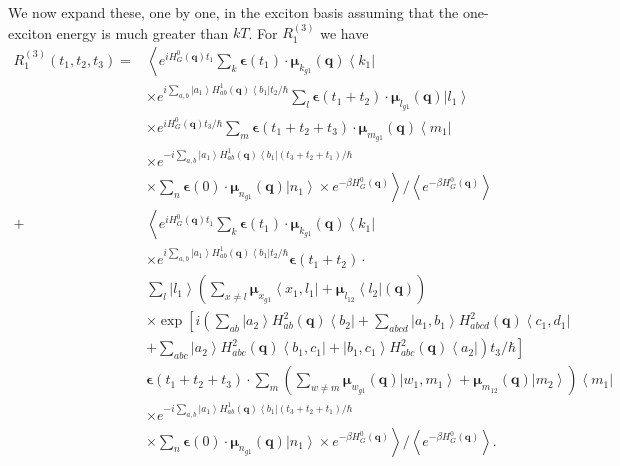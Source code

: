 \documentclass{article}
\newcommand{\bra}[1]{\ensuremath{\left\langle#1\right|}}
\newcommand{\ket}[1]{\ensuremath{\left|#1\right\rangle}}
\newcommand{\ensb}[1]{\left\langle#1\right\rangle}
\newcommand{\vect}[1]{\ensuremath{\boldsymbol{\mathbf{#1}}}}
\begin{document}
We now expand these, one by one, in the exciton basis assuming that the one-exciton energy is much greater than $kT$.
For $R_{1}^{(3)}$ we have
\begin{equation}
\begin{split}
R_{1}^{(3)}(t_{1},t_{2},t_{3})=
&\left \langle e^{iH_{G}^{0}(\vect q)t_{1}}\sum_{k}\vect{\epsilon}(t_{1})\cdot\vect\mu_{k_{g1}}(\vect q)\bra{k_{1}}\right.\\
&\times e^{i\sum_{a,b}\ket{a_{1}}H_{ab}^{1}(\vect q)\bra{b_{1}}t_{2}/\hbar}\sum_{l}\vect\epsilon(t_{1}+t_{2})\cdot\vect\mu_{l_{g1}}(\vect q)\ket{l_{1}}\\
&\times e^{iH_{G}^{0}(\vect q)t_{3}/\hbar}\sum_{m}\vect\epsilon(t_{1}+t_{2}+t_{3})\cdot\vect\mu_{m_{g1}}(\vect q)\bra{m_{1}}\\
&\times e^{-i\sum_{a,b}\ket{a_{1}}H_{ab}^{1}(\vect q)\bra{b_{1}}(t_{3}+t_{2}+t_{1})/\hbar}\\
&\left. \times \sum_{n}\vect\epsilon(0)\cdot\vect\mu_{n_{g1}}(\vect q)\ket{n_{1}}
\times e^{-\beta H_{G}^{0}(\vect{q})}\right\rangle/\ensb{e^{-\beta H_{G}^{0}(\vect{q})}}\\
+&\left \langle e^{iH_{G}^{0}(\vect q)t_{1}}\sum_{k}\vect{\epsilon}(t_{1})\cdot\vect\mu_{k_{g1}}(\vect q)\bra{k_{1}}\right.\\
&\times e^{i\sum_{a,b}\ket{a_{1}}H_{ab}^{1}(\vect q)\bra{b_{1}}t_{2}/\hbar}\vect\epsilon(t_{1}+t_{2})\cdot\\
&\sum_{l}\ket{l_{1}}\left(\sum_{x\ne l}\vect\mu_{x_{g1}}\bra{x_{1},l_{1}}+\vect\mu_{l_{12}}\bra{l_{2}}(\vect q)\right)\\
&\times \exp\left[i\left(\sum_{ab}\ket{a_{2}}H_{ab}^{2}(\vect{q})\bra{b_{2}}+\sum_{abcd}\ket{a_{1},b_{1}}H_{abcd}^{2}(\vect{q})\bra{c_{1},d_{1}}\right.\right.\\
&\left.\left.+\sum_{abc}\ket{a_{2}}H_{abc}^{2}(\vect{q})\bra{b_{1},c_{1}}+\ket{b_{1},c_{1}}H_{abc}^{2}(\vect{q})\bra{a_{2}}\right)t_{3}/\hbar\right]\\
&\vect\epsilon(t_{1}+t_{2}+t_{3})\cdot\sum_{m}\left( 
\sum_{w\ne m}\vect\mu_{w_{g1}}(\vect q)\ket{w_{1},m_{1}}
+\vect\mu_{m_{12}}(\vect q)\ket{m_{2}}\right)\bra{m_{1}}\\
&\times e^{-i\sum_{a,b}\ket{a_{1}}H_{ab}^{1}(\vect q)\bra{b_{1}}(t_{3}+t_{2}+t_{1})/\hbar}\\
&\left. \times \sum_{n}\vect\epsilon(0)\cdot\vect\mu_{n_{g1}}(\vect q)\ket{n_{1}}
\times e^{-\beta H_{G}^{0}(\vect{q})}\right\rangle/\ensb{e^{-\beta H_{G}^{0}(\vect{q})}}.
\end{split}
\end{equation}
\end{document}
